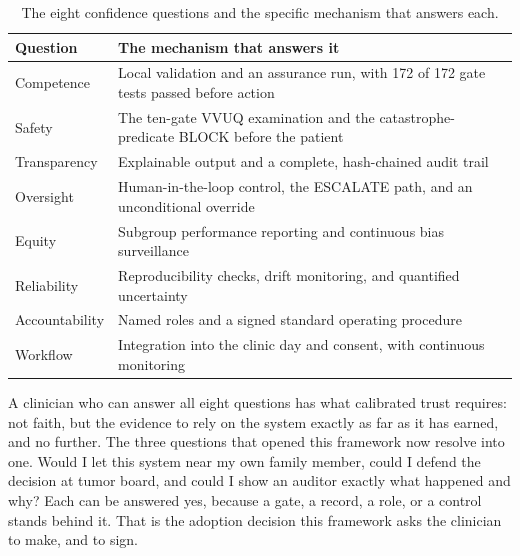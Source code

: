 \begin{table}[H]
\footnotesize
\begin{tabularx}{\textwidth}{@{}L{3.0cm} Y@{}}
\toprule
\textbf{Question} & \textbf{The mechanism that answers it}\\
\midrule
Competence & Local validation and an assurance run, with 172 of 172 gate tests passed before action\\
Safety & The ten-gate VVUQ examination and the catastrophe-predicate BLOCK before the patient\\
Transparency & Explainable output and a complete, hash-chained audit trail\\
Oversight & Human-in-the-loop control, the ESCALATE path, and an unconditional override\\
Equity & Subgroup performance reporting and continuous bias surveillance\\
Reliability & Reproducibility checks, drift monitoring, and quantified uncertainty\\
Accountability & Named roles and a signed standard operating procedure\\
Workflow & Integration into the clinic day and consent, with continuous monitoring\\
\bottomrule
\end{tabularx}
\caption{The eight confidence questions and the specific mechanism that answers each.}
\label{tab:synthesis}
\end{table}

A clinician who can answer all eight questions has what calibrated trust requires:
not faith, but the evidence to rely on the system exactly as far as it has earned,
and no further. The three questions that opened this framework now resolve into one.
Would I let this system near my own family member, could I defend the decision at
tumor board, and could I show an auditor exactly what happened and why? Each can be
answered yes, because a gate, a record, a role, or a control stands behind it. That
is the adoption decision this framework asks the clinician to make, and to sign.
